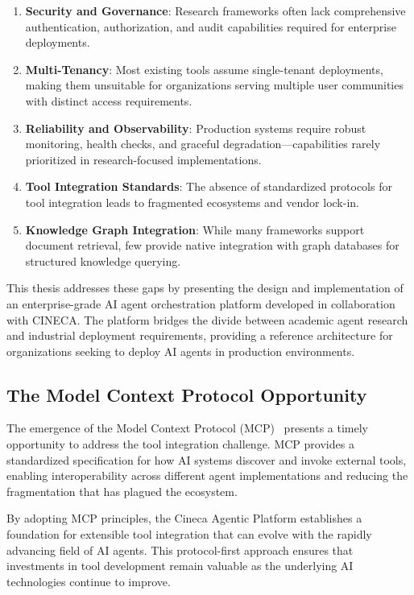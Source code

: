 \begin{enumerate}
    \item \textbf{Security and Governance}: Research frameworks often lack comprehensive authentication, authorization, and audit capabilities required for enterprise deployments.
    
    \item \textbf{Multi-Tenancy}: Most existing tools assume single-tenant deployments, making them unsuitable for organizations serving multiple user communities with distinct access requirements.
    
    \item \textbf{Reliability and Observability}: Production systems require robust monitoring, health checks, and graceful degradation---capabilities rarely prioritized in research-focused implementations.
    
    \item \textbf{Tool Integration Standards}: The absence of standardized protocols for tool integration leads to fragmented ecosystems and vendor lock-in.
    
    \item \textbf{Knowledge Graph Integration}: While many frameworks support document retrieval, few provide native integration with graph databases for structured knowledge querying.
\end{enumerate}

This thesis addresses these gaps by presenting the design and implementation of an enterprise-grade AI agent orchestration platform developed in collaboration with CINECA. The platform bridges the divide between academic agent research and industrial deployment requirements, providing a reference architecture for organizations seeking to deploy AI agents in production environments.

\subsection{The Model Context Protocol Opportunity}

The emergence of the Model Context Protocol (MCP)~\cite{anthropic2024mcp} presents a timely opportunity to address the tool integration challenge. MCP provides a standardized specification for how AI systems discover and invoke external tools, enabling interoperability across different agent implementations and reducing the fragmentation that has plagued the ecosystem.

By adopting MCP principles, the Cineca Agentic Platform establishes a foundation for extensible tool integration that can evolve with the rapidly advancing field of AI agents. This protocol-first approach ensures that investments in tool development remain valuable as the underlying AI technologies continue to improve.

